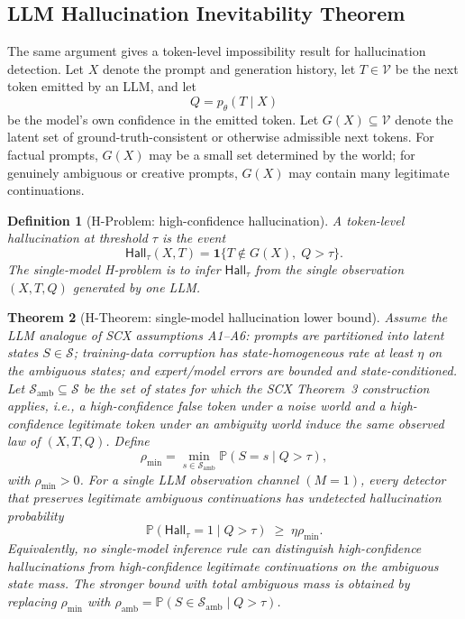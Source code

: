 \documentclass[11pt,twocolumn]{article}
\newtheorem{theorem}{Theorem}[section]
\newtheorem{definition}[theorem]{Definition}
\renewcommand{\P}{\mathbb{P}}
\newcommand{\cS}{\mathcal{S}}
\begin{document}
\subsection{LLM Hallucination Inevitability Theorem}
\label{sec:llm_hallucination_inevitability}

The same argument gives a token-level impossibility result for hallucination detection. Let $X$ denote the prompt and generation history, let $T \in \mathcal{V}$ be the next token emitted by an LLM, and let
\[
Q = p_\theta(T \mid X)
\]
be the model's own confidence in the emitted token. Let $G(X) \subseteq \mathcal{V}$ denote the latent set of ground-truth-consistent or otherwise admissible next tokens. For factual prompts, $G(X)$ may be a small set determined by the world; for genuinely ambiguous or creative prompts, $G(X)$ may contain many legitimate continuations.

\begin{definition}[H-Problem: high-confidence hallucination]
\label{def:h_problem}
A token-level hallucination at threshold $\tau$ is the event
\[
\mathsf{Hall}_\tau(X,T)
=
\mathbf{1}\{T \notin G(X),\; Q > \tau\}.
\]
The single-model H-problem is to infer $\mathsf{Hall}_\tau$ from the single observation $(X,T,Q)$ generated by one LLM.
\end{definition}

\begin{theorem}[H-Theorem: single-model hallucination lower bound]
\label{thm:h_theorem}
Assume the LLM analogue of SCX assumptions A1--A6: prompts are partitioned into latent states $S \in \cS$; training-data corruption has state-homogeneous rate at least $\eta$ on the ambiguous states; and expert/model errors are bounded and state-conditioned. Let $\cS_{\mathrm{amb}} \subseteq \cS$ be the set of states for which the SCX Theorem~3 construction applies, i.e., a high-confidence false token under a noise world and a high-confidence legitimate token under an ambiguity world induce the same observed law of $(X,T,Q)$. Define
\[
\rho_{\min}
=
\min_{s \in \cS_{\mathrm{amb}}}
\P(S=s \mid Q>\tau),
\]
with $\rho_{\min}>0$. For a single LLM observation channel $(M=1)$, every detector that preserves legitimate ambiguous continuations has undetected hallucination probability
\[
\P(\mathsf{Hall}_\tau=1 \mid Q>\tau)
\;\geq\;
\eta \rho_{\min}.
\]
Equivalently, no single-model inference rule can distinguish high-confidence hallucinations from high-confidence legitimate continuations on the ambiguous state mass. The stronger bound with total ambiguous mass is obtained by replacing $\rho_{\min}$ with $\rho_{\mathrm{amb}}=\P(S\in\cS_{\mathrm{amb}}\mid Q>\tau)$.
\end{theorem}
\end{document}
